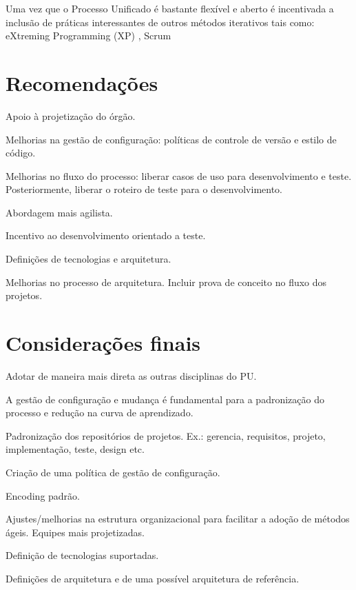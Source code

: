 \documentclass[
	article,			%
	11pt,				%
	oneside,			%
	a4paper,			%
	english,			%
	brazil,				%
	sumario=tradicional
	]{abntex2}
\begin{document}
Uma vez que o Processo Unificado é bastante flexível e aberto é incentivada a
inclusão de práticas interessantes de outros métodos iterativos tais como:
eXtreming Programming (XP) \cite{Beck:1999:ECE:619045.621348}, Scrum \cite{schwaber2002agile}

\section{Recomendações}

Apoio à projetização do órgão.

Melhorias na gestão de configuração: políticas de controle de versão e estilo de
código.

Melhorias no fluxo do processo: liberar casos de uso para desenvolvimento e
teste. Posteriormente, liberar o roteiro de teste para o desenvolvimento.

Abordagem mais agilista.

Incentivo ao desenvolvimento  orientado a teste.

Definições de tecnologias e arquitetura.

Melhorias no processo de arquitetura. Incluir prova de conceito no fluxo dos
projetos.

% 

\section*{Considerações finais}

Adotar de maneira mais direta as outras disciplinas do PU.

A gestão de configuração e mudança é fundamental para a padronização do processo
e redução na curva de aprendizado.

Padronização dos repositórios de projetos. Ex.: gerencia, requisitos, projeto,
implementação, teste, design etc.

Criação de uma política de gestão de configuração.

Encoding padrão.

Ajustes/melhorias na estrutura organizacional para facilitar a adoção de
métodos ágeis. Equipes mais projetizadas.

Definição de tecnologias suportadas.

Definições de arquitetura e de uma possível arquitetura de referência.

\postextual


\end{document}

